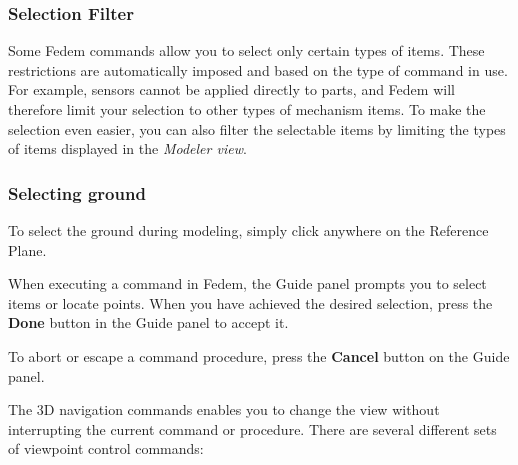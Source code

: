 \subsubsection{Selection Filter}

Some Fedem commands allow you to select only certain types of items.
These restrictions are automatically imposed and based on the type
of command in use. For example, sensors cannot be applied directly to
parts, and Fedem will therefore limit your selection to other types
of mechanism items. To make the selection even easier, you can also
filter the selectable items by limiting the types of items displayed
in the {\sl Modeler view}.


\subsubsection{Selecting ground}

To select the ground during modeling,
simply click anywhere on the Reference Plane.


When executing a command in Fedem, the Guide panel prompts you to select
items or locate points. When you have achieved the desired selection, press
the \textbf{Done} button in the Guide panel to accept it.



To abort or escape a command procedure,
press the \textbf{Cancel} button on the Guide panel.





The 3D navigation commands enables you to change the view without interrupting
the current command or procedure.
There are several different sets of viewpoint control commands:

